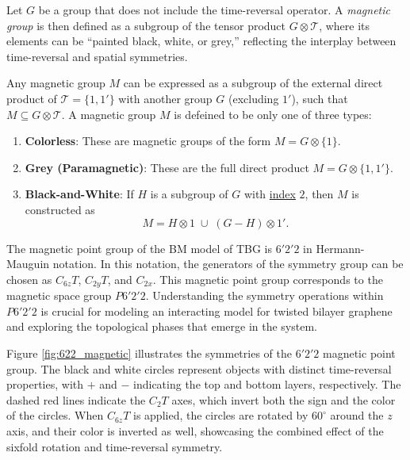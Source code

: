 \documentclass[12pt]{report}
\begin{document}
Let \(G\) be a group that does not include the time-reversal operator. A \textit{magnetic group} is then defined as a subgroup of the tensor product \(G \otimes \mathcal{T}\), where its elements can be ``painted black, white, or grey,'' reflecting the interplay between time-reversal and spatial symmetries.

\begin{definition} \label{def:magnetic_group}
Any magnetic group \( M \) can be expressed as a subgroup of the external direct product of \( \mathcal{T} = \{1, 1'\}\) with another group \( G \) (excluding \( 1' \)), such that \( M \subseteq G \otimes \mathcal{T} \). A magnetic group $M$ is defeined to be only one of three types:
\begin{enumerate}
\item \textbf{Colorless}: These are magnetic groups of the form \(M =  G \otimes \{1\} \).

\item \textbf{Grey (Paramagnetic)}: These are the full direct product \(M = G \otimes \{1, 1'\} \).

\item \textbf{Black-and-White}: If \( H \) is a subgroup of \( G \) with \hyperref[def:left_cosets]{index} \(2\), then \( M \) is constructed as
\begin{equation} \label{eq:magnetic_black_white_def}
M = H \otimes 1 \; \cup \; (G - H) \otimes 1'.
\end{equation}
\end{enumerate}
\end{definition}

The magnetic point group of the BM model of TBG is \(6'2'2\) in Hermann-Mauguin notation. In this notation, the generators of the symmetry group can be chosen as \(C_{6z} T\), \(C_{2y} T\), and \(C_{2x}\). This magnetic point group corresponds to the magnetic space group \(P6'2'2\). Understanding the symmetry operations within \(P6'2'2\) is crucial for modeling an interacting model for twisted bilayer graphene and exploring the topological phases that emerge in the system.

Figure \ref{fig:622_magnetic} illustrates the symmetries of the \(6'2'2\) magnetic point group. The black and white circles represent objects with distinct time-reversal properties, with \(+\) and \(-\) indicating the top and bottom layers, respectively. The dashed red lines indicate the \(C_2 T\) axes, which invert both the sign and the color of the circles. When \(C_{6z} T\) is applied, the circles are rotated by \(60^\circ\) around the $z$ axis, and their color is inverted as well, showcasing the combined effect of the sixfold rotation and time-reversal symmetry.
\end{document}
